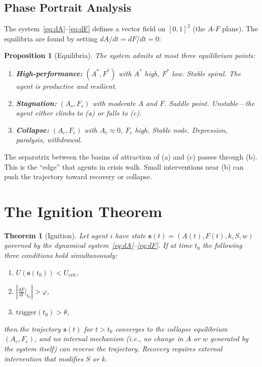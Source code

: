 \documentclass[12pt, a4paper]{article}
\newtheorem{theorem}{Theorem}[section]
\newtheorem{proposition}{Proposition}[section]
\theoremstyle{remark}
\newcommand{\Ucrit}{U_{\text{crit}}}
\newcommand{\ddt}[1]{\frac{d#1}{dt}}
\begin{document}
\subsection{Phase Portrait Analysis}

The system~\eqref{eq:dA}--\eqref{eq:dF} defines a vector field on
$[0,1]^2$ (the $A$-$F$ plane). The equilibria are found by setting
$dA/dt = dF/dt = 0$:

\begin{proposition}[Equilibria]\label{prop:eq}
The system admits at most three equilibrium points:
\begin{enumerate}[nosep, label=(\alph*)]
    \item \textbf{High-performance:} $(A^*, F^*)$ with $A^*$ high,
          $F^*$ low. Stable spiral. The agent is productive and resilient.
    \item \textbf{Stagnation:} $(A_s, F_s)$ with moderate $A$ and $F$.
          Saddle point. Unstable---the agent either climbs to (a) or
          falls to (c).
    \item \textbf{Collapse:} $(A_c, F_c)$ with $A_c \approx 0$,
          $F_c$ high. Stable node. Depression, paralysis, withdrawal.
\end{enumerate}
\end{proposition}

The separatrix between the basins of attraction of (a) and (c) passes
through (b). This is the ``edge'' that agents in crisis walk. Small
interventions near (b) can push the trajectory toward recovery or collapse.

\section{The Ignition Theorem}

\begin{theorem}[Ignition]\label{thm:ignition}
Let agent $i$ have state $\mathbf{s}(t) = (A(t), F(t), k, S, w)$ governed
by the dynamical system~\eqref{eq:dA}--\eqref{eq:dF}. If at time $t_0$
the following three conditions hold simultaneously:
\begin{enumerate}[nosep, label=(\roman*)]
    \item $U(\mathbf{s}(t_0)) < \Ucrit$,
    \item $\left|\ddt{F}\bigg|_{t_0}\right| > \varphi$,
    \item $\text{trigger}(t_0) > \theta$,
\end{enumerate}
then the trajectory $\mathbf{s}(t)$ for $t > t_0$ converges to the
collapse equilibrium $(A_c, F_c)$, and no internal mechanism
(i.e., no change in $A$ or $w$ generated by the system itself)
can reverse the trajectory. Recovery requires external intervention
that modifies $S$ or $k$.
\end{theorem}
\end{document}
